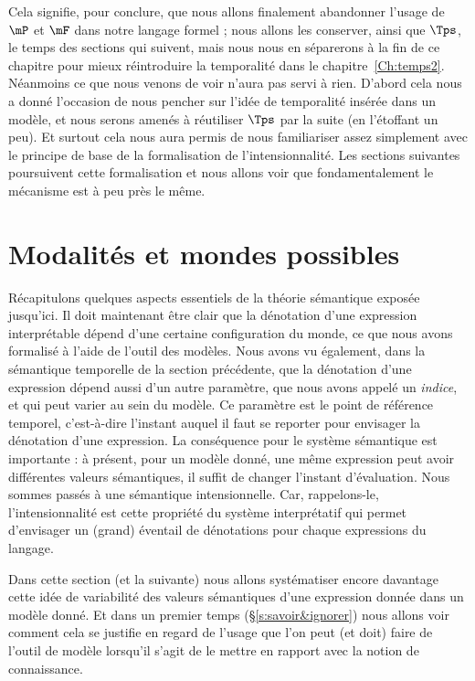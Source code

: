 Cela signifie, pour conclure, que nous allons finalement abandonner l'usage de $\mP$ et $\mF$ dans notre langage formel ; nous allons les conserver, ainsi que $\Tps$, le temps des sections qui suivent, mais nous nous en séparerons à la fin de ce chapitre pour mieux réintroduire la temporalité dans le chapitre~\ref{Ch:temps2}.  Néanmoins ce que nous venons de voir n'aura pas servi à rien. 
D'abord cela nous a donné l'occasion de nous pencher sur l'idée de temporalité insérée dans un modèle, et nous serons amenés à réutiliser $\Tps$ par la suite (en l'étoffant un peu). Et surtout cela nous aura permis de nous familiariser assez simplement avec le principe de base de la formalisation de l'intensionnalité. 
Les sections suivantes poursuivent cette formalisation et nous allons voir que fondamentalement le mécanisme est à peu près le même.






\section{Modalités et mondes possibles}
\label{s:mondes}


Récapitulons quelques aspects essentiels de la théorie sémantique
exposée jusqu'ici.  Il doit maintenant être clair que la
dénotation d'une expression interprétable dépend d'une certaine
configuration du monde, ce que nous avons formalisé à l'aide de
l'outil des modèles.  Nous avons vu également, dans la sémantique
temporelle de la section précédente, que la dénotation d'une
expression dépend aussi d'un autre paramètre, que nous avons appelé un \emph{indice}, et qui peut varier au
sein du modèle.  Ce paramètre est le point de référence temporel,
c'est-à-dire l'instant auquel il faut se reporter pour
envisager la dénotation d'une expression.   La conséquence pour le
système sémantique est importante : à présent, pour un modèle {\Modele}
donné, une même expression peut avoir différentes valeurs sémantiques,
il suffit de changer l'instant d'évaluation.   Nous sommes passés à une
sémantique intensionnelle.
Car, rappelons-le, l'intensionnalité est cette propriété du système
interprétatif  qui permet d'envisager un (grand) éventail de
dénotations pour chaque expressions du langage.


Dans cette section (et la suivante) nous allons systématiser encore
davantage cette idée de variabilité des valeurs sémantiques d'une
expression donnée dans un modèle donné.  Et dans un premier temps
(\S\ref{s:savoir&ignorer}) nous allons voir comment cela se
justifie en regard de l'usage que l'on peut (et doit) faire de l'outil
de modèle lorsqu'il s'agit de le mettre en rapport avec la notion de
connaissance.  



